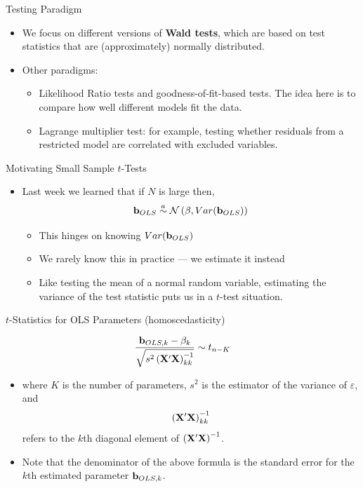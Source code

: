 \begin{frame}{Testing Paradigm}
\begin{itemize}

	\item We focus on different versions of {\bf Wald tests}, which are based on test 
	statistics that are (approximately) normally distributed.

	\medskip
	\item Other paradigms:
	\begin{itemize}
		\item Likelihood Ratio tests and goodness-of-fit-based tests. The idea here is to compare how well
		different models fit the data.

		\item Lagrange multiplier test: for example, testing whether residuals from a restricted model are
		correlated with excluded variables. 
	\end{itemize}
\end{itemize}
\end{frame}


\begin{frame}{Motivating Small Sample $t$-Tests}
\begin{itemize}
	\item Last week we learned that if $N$ is large then,
	\[
		{\bf b}_{OLS} \stackrel{a}{\sim}\mathcal{N}\left(\beta,Var({\bf b}_{OLS})\right)
	\]
	\begin{itemize}
		\item This hinges on knowing $Var({\bf b}_{OLS})$
		\item We rarely know this in practice --- we estimate it instead
		\item Like testing the mean of a normal random variable, estimating the variance
		of the test statistic puts us in a $t$-test situation.
	\end{itemize}
\end{itemize}
\end{frame}

\begin{frame}{$t$-Statistics for OLS Parameters (homoscedasticity)}

\[
\frac{{\bf b}_{OLS,k} - \beta_k}{\sqrt{s^2 \left( {\bf X}' {\bf X}\right)^{-1}_{kk}}} \sim t_{n-K}
\]

\begin{itemize}
	\item where $K$ is the number of parameters,  $s^2$ is the estimator of
	the variance of $\varepsilon$, and \[
	\left( {\bf X}' {\bf X}\right)^{-1}_{kk}
	\]
	refers to the $k$th diagonal element of $\left( {\bf X}' {\bf X}\right)^{-1}$.

	\item Note that the denominator of the above formula is the standard error for the $k$th
	estimated parameter ${\bf b}_{OLS,k} $.

\end{itemize}
\end{frame}


